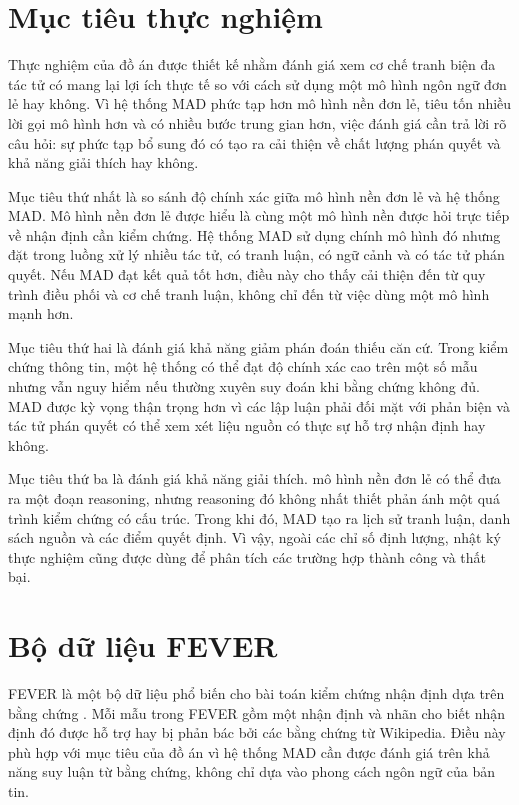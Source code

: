 ﻿\documentclass[oneside,a4paper,12pt]{extreport}
\begin{document}
\section{Mục tiêu thực nghiệm}

Thực nghiệm của đồ án được thiết kế nhằm đánh giá xem cơ chế tranh biện đa tác tử có mang lại lợi ích thực tế so với cách sử dụng một mô hình ngôn ngữ đơn lẻ hay không. Vì hệ thống MAD phức tạp hơn mô hình nền đơn lẻ, tiêu tốn nhiều lời gọi mô hình hơn và có nhiều bước trung gian hơn, việc đánh giá cần trả lời rõ câu hỏi: sự phức tạp bổ sung đó có tạo ra cải thiện về chất lượng phán quyết và khả năng giải thích hay không.

Mục tiêu thứ nhất là so sánh độ chính xác giữa mô hình nền đơn lẻ và hệ thống MAD. Mô hình nền đơn lẻ được hiểu là cùng một mô hình nền được hỏi trực tiếp về nhận định cần kiểm chứng. Hệ thống MAD sử dụng chính mô hình đó nhưng đặt trong luồng xử lý nhiều tác tử, có tranh luận, có ngữ cảnh và có tác tử phán quyết. Nếu MAD đạt kết quả tốt hơn, điều này cho thấy cải thiện đến từ quy trình điều phối và cơ chế tranh luận, không chỉ đến từ việc dùng một mô hình mạnh hơn.

Mục tiêu thứ hai là đánh giá khả năng giảm phán đoán thiếu căn cứ. Trong kiểm chứng thông tin, một hệ thống có thể đạt độ chính xác cao trên một số mẫu nhưng vẫn nguy hiểm nếu thường xuyên suy đoán khi bằng chứng không đủ. MAD được kỳ vọng thận trọng hơn vì các lập luận phải đối mặt với phản biện và tác tử phán quyết có thể xem xét liệu nguồn có thực sự hỗ trợ nhận định hay không.

Mục tiêu thứ ba là đánh giá khả năng giải thích. mô hình nền đơn lẻ có thể đưa ra một đoạn reasoning, nhưng reasoning đó không nhất thiết phản ánh một quá trình kiểm chứng có cấu trúc. Trong khi đó, MAD tạo ra lịch sử tranh luận, danh sách nguồn và các điểm quyết định. Vì vậy, ngoài các chỉ số định lượng, nhật ký thực nghiệm cũng được dùng để phân tích các trường hợp thành công và thất bại.

\section{Bộ dữ liệu FEVER}

FEVER là một bộ dữ liệu phổ biến cho bài toán kiểm chứng nhận định dựa trên bằng chứng \cite{thorne2018fever}. Mỗi mẫu trong FEVER gồm một nhận định và nhãn cho biết nhận định đó được hỗ trợ hay bị phản bác bởi các bằng chứng từ Wikipedia. Điều này phù hợp với mục tiêu của đồ án vì hệ thống MAD cần được đánh giá trên khả năng suy luận từ bằng chứng, không chỉ dựa vào phong cách ngôn ngữ của bản tin.
\end{document}
